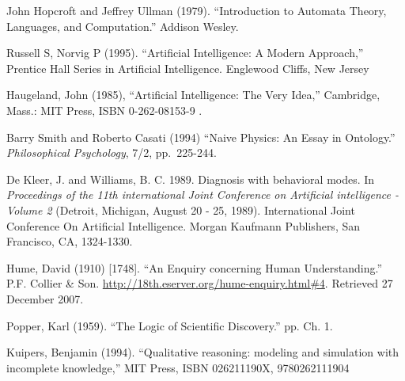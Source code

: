 \documentclass{article} %
\begin{document}
\begin{thebibliography}{99}
	John Hopcroft and Jeffrey Ullman (1979). 
	``Introduction to Automata Theory, Languages, and Computation.'' Addison Wesley.

	Russell S, Norvig P (1995). 
	``Artificial Intelligence: A Modern Approach,'' 
	Prentice Hall Series in Artificial Intelligence. Englewood Cliffs, New Jersey

	Haugeland, John (1985), 
	``Artificial Intelligence: The Very Idea,''
	Cambridge, Mass.: MIT Press, ISBN 0-262-08153-9 .

	Barry Smith and Roberto Casati (1994)
	``Naive Physics: An Essay in Ontology.''
	{\em Philosophical Psychology}, 7/2, pp.\ 225-244.

	De Kleer, J. and Williams, B. C. 1989. Diagnosis with behavioral modes.
	In \emph{Proceedings of the 11th international Joint Conference on Artificial
	intelligence - Volume 2} (Detroit, Michigan, August 20 - 25, 1989).
	International Joint Conference On Artificial Intelligence. Morgan
	Kaufmann Publishers, San Francisco, CA, 1324-1330. 

	Hume, David (1910) [1748]. 
	``An Enquiry concerning Human Understanding.''
	P.F. Collier \& Son. 
	\url{http://18th.eserver.org/hume-enquiry.html#4}. 
	Retrieved 27 December 2007.

	Popper, Karl (1959). 
	``The Logic of Scientific Discovery.'' pp. Ch. 1. 

	Kuipers, Benjamin (1994). ``Qualitative reasoning: modeling and simulation with incomplete knowledge,''
	MIT Press, ISBN	026211190X, 9780262111904

\end{thebibliography}
\end{document}
